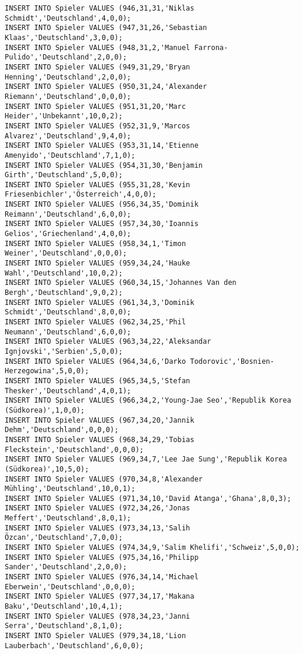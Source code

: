 \documentclass{bschlangaul-aufgabe}
\begin{document}
\begin{verbatim}
INSERT INTO Spieler VALUES (946,31,31,'Niklas Schmidt','Deutschland',4,0,0);
INSERT INTO Spieler VALUES (947,31,26,'Sebastian Klaas','Deutschland',3,0,0);
INSERT INTO Spieler VALUES (948,31,2,'Manuel Farrona-Pulido','Deutschland',2,0,0);
INSERT INTO Spieler VALUES (949,31,29,'Bryan Henning','Deutschland',2,0,0);
INSERT INTO Spieler VALUES (950,31,24,'Alexander Riemann','Deutschland',0,0,0);
INSERT INTO Spieler VALUES (951,31,20,'Marc Heider','Unbekannt',10,0,2);
INSERT INTO Spieler VALUES (952,31,9,'Marcos Alvarez','Deutschland',9,4,0);
INSERT INTO Spieler VALUES (953,31,14,'Etienne Amenyido','Deutschland',7,1,0);
INSERT INTO Spieler VALUES (954,31,30,'Benjamin Girth','Deutschland',5,0,0);
INSERT INTO Spieler VALUES (955,31,28,'Kevin Friesenbichler','Österreich',4,0,0);
INSERT INTO Spieler VALUES (956,34,35,'Dominik Reimann','Deutschland',6,0,0);
INSERT INTO Spieler VALUES (957,34,30,'Ioannis Gelios','Griechenland',4,0,0);
INSERT INTO Spieler VALUES (958,34,1,'Timon Weiner','Deutschland',0,0,0);
INSERT INTO Spieler VALUES (959,34,24,'Hauke Wahl','Deutschland',10,0,2);
INSERT INTO Spieler VALUES (960,34,15,'Johannes Van den Bergh','Deutschland',9,0,2);
INSERT INTO Spieler VALUES (961,34,3,'Dominik Schmidt','Deutschland',8,0,0);
INSERT INTO Spieler VALUES (962,34,25,'Phil Neumann','Deutschland',6,0,0);
INSERT INTO Spieler VALUES (963,34,22,'Aleksandar Ignjovski','Serbien',5,0,0);
INSERT INTO Spieler VALUES (964,34,6,'Darko Todorovic','Bosnien-Herzegowina',5,0,0);
INSERT INTO Spieler VALUES (965,34,5,'Stefan Thesker','Deutschland',4,0,1);
INSERT INTO Spieler VALUES (966,34,2,'Young-Jae Seo','Republik Korea (Südkorea)',1,0,0);
INSERT INTO Spieler VALUES (967,34,20,'Jannik Dehm','Deutschland',0,0,0);
INSERT INTO Spieler VALUES (968,34,29,'Tobias Fleckstein','Deutschland',0,0,0);
INSERT INTO Spieler VALUES (969,34,7,'Lee Jae Sung','Republik Korea (Südkorea)',10,5,0);
INSERT INTO Spieler VALUES (970,34,8,'Alexander Mühling','Deutschland',10,0,1);
INSERT INTO Spieler VALUES (971,34,10,'David Atanga','Ghana',8,0,3);
INSERT INTO Spieler VALUES (972,34,26,'Jonas Meffert','Deutschland',8,0,1);
INSERT INTO Spieler VALUES (973,34,13,'Salih Özcan','Deutschland',7,0,0);
INSERT INTO Spieler VALUES (974,34,9,'Salim Khelifi','Schweiz',5,0,0);
INSERT INTO Spieler VALUES (975,34,16,'Philipp Sander','Deutschland',2,0,0);
INSERT INTO Spieler VALUES (976,34,14,'Michael Eberwein','Deutschland',0,0,0);
INSERT INTO Spieler VALUES (977,34,17,'Makana Baku','Deutschland',10,4,1);
INSERT INTO Spieler VALUES (978,34,23,'Janni Serra','Deutschland',8,1,0);
INSERT INTO Spieler VALUES (979,34,18,'Lion Lauberbach','Deutschland',6,0,0);

\end{verbatim}
\end{document}
